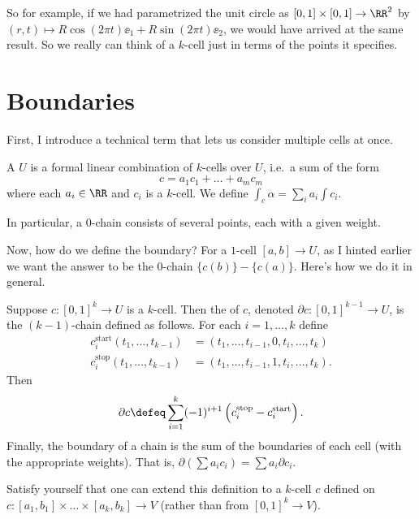 So for example, if we had parametrized the unit circle as $[0,1] \times [0,1] \to \RR^2$
by $(r,t) \mapsto R\cos(2\pi t) \ee_1 + R\sin(2\pi t) \ee_2$, we would have arrived at the same result.
So we really can think of a $k$-cell just in terms of the points it specifies.

\section{Boundaries}
First, I introduce a technical term that lets us consider multiple cells at once.
\begin{definition}
	A  $U$ is a formal
	linear combination of $k$-cells over $U$,
	i.e.\ a sum of the form
	\[ c = a_1 c_1 + \dots + a_m c_m \]
	where each $a_i \in \RR$ and $c_i$ is a $k$-cell.
	We define $\int_c \alpha = \sum_i a_i \int c_i$.
\end{definition}
In particular, a $0$-chain consists of several points, each with a given weight.

Now, how do we define the boundary?
For a $1$-cell $[a,b] \to U$, as I hinted earlier we want the answer to be the $0$-chain $\{c(b)\}-\{c(a)\}$.
Here's how we do it in general.
\begin{definition}
	Suppose $c : [0,1]^k \to U$ is a $k$-cell.
	Then the  of $c$, denoted $\partial c : [0,1]^{k-1} \to U$,
	is the $(k-1)$-chain defined as follows.
	For each $i = 1,\dots,k$ define
	\begin{align*}
		c_i^{\text{start}}(t_1, \dots, t_{k-1}) &
		= (t_1, \dots, t_{i-1}, 0, t_i, \dots, t_k) \\
		c_i^{\text{stop}}(t_1, \dots, t_{k-1}) &
		= (t_1, \dots, t_{i-1}, 1, t_i, \dots, t_k).
	\end{align*}
	Then
	\[ \partial c \defeq
	\sum_{i=1}^k (-1)^{i+1} \left( c_i^{\text{stop}} - c_i^{\text{start}}  \right). \]
	Finally, the boundary of a chain is the sum of the boundaries of each cell (with the appropriate weights).
	That is, $\partial(\sum a_ic_i) = \sum a_i \partial c_i$.
\end{definition}
\begin{ques}
	Satisfy yourself that one can extend this definition to
	a $k$-cell $c$ defined on $c : [a_1, b_1] \times \dots \times [a_k, b_k] \to V$
	(rather than from $[0,1]^k \to V$).
\end{ques}

